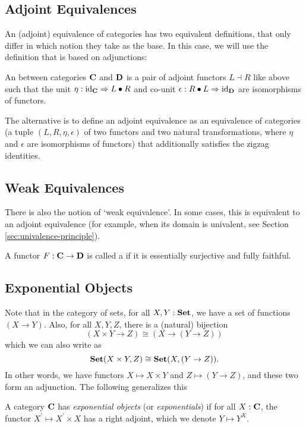 \subsection{Adjoint Equivalences}
An (adjoint) equivalence of categories has two equivalent definitions, that only differ in which notion they take as the base. In this case, we will use the definition that is based on adjunctions:
\begin{definition}\label{def:equivalence-of-categories}
  An  between categories $ \mathbf{C} $ and $ \mathbf{D} $ is a pair of adjoint functors $ L \dashv R $ like above such that the unit $ \eta: \text{id}_{\mathbf{C}} \Rightarrow L \bullet R $ and co-unit $ \epsilon: R \bullet L \Rightarrow \text{id}_{\mathbf{D}} $ are isomorphisms of functors.
\end{definition}

The alternative is to define an adjoint equivalence as an equivalence of categories (a tuple $ (L, R, \eta, \epsilon) $ of two functors and two natural transformations, where $ \eta $ and $ \epsilon $ are isomorphisms of functors) that additionally satisfies the zigzag identities.

\subsection{Weak Equivalences}
There is also the notion of `weak equivalence'. In some cases, this is equivalent to an adjoint equivalence (for example, when its domain is univalent, see Section \ref{sec:univalence-principle}).
\begin{definition}
  A functor $ F: \mathbf{C} \to \mathbf{D} $ is called a  if it is essentially surjective and fully faithful.
\end{definition}

\subsection{Exponential Objects}
Note that in the category of sets, for all $ X, Y: \mathbf{Set} $, we have a set of functions $ (X \to Y) $. Also, for all $ X, Y, Z $, there is a (natural) bijection
\[ (X \times Y \to Z) \cong (X \to (Y \to Z)) \]
which we can also write as
\[ \mathbf{Set}(X \times Y, Z) \cong \mathbf{Set}(X, (Y \to Z)). \]
In other words, we have functors $ X \mapsto X \times Y $ and $ Z \mapsto (Y \to Z) $, and these two form an adjunction. The following generalizes this
\begin{definition}
  A category $ \mathbf{C} $ has \textit{exponential objects} (or \textit{exponentials}) if for all $ X: \mathbf{C} $, the functor $ X^\prime \mapsto X^\prime \times X $ has a right adjoint, which we denote $ Y \mapsto Y^X $.
\end{definition}

